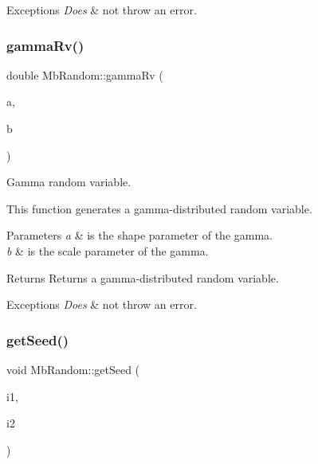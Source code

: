 \begin{DoxyExceptions}{Exceptions}
{\em Does} & not throw an error. \\
\hline
\end{DoxyExceptions}
\mbox{\label{class_mb_random_ac5f030bb3dab8a93bd3430e8b9319d88}} 
\subsubsection{\texorpdfstring{gammaRv()}{gammaRv()}}
{\footnotesize\ttfamily double Mb\+Random\+::gamma\+Rv (\begin{DoxyParamCaption}\item[{double}]{a,  }\item[{double}]{b }\end{DoxyParamCaption})}



Gamma random variable. 

This function generates a gamma-\/distributed random variable.


\begin{DoxyParams}{Parameters}
{\em a} & is the shape parameter of the gamma. \\
\hline
{\em b} & is the scale parameter of the gamma. \\
\hline
\end{DoxyParams}
\begin{DoxyReturn}{Returns}
Returns a gamma-\/distributed random variable. 
\end{DoxyReturn}

\begin{DoxyExceptions}{Exceptions}
{\em Does} & not throw an error. \\
\hline
\end{DoxyExceptions}
\mbox{\label{class_mb_random_a5a143a97da5fa43d5220fc628ceabe25}} 
\subsubsection{\texorpdfstring{getSeed()}{getSeed()}}
{\footnotesize\ttfamily void Mb\+Random\+::get\+Seed (\begin{DoxyParamCaption}\item[{\mbox{\hyperlink{_mb_random_8h_a4aa644a391dc423f6cb86710cc056d8b}{seed\+Type}} \&}]{i1,  }\item[{\mbox{\hyperlink{_mb_random_8h_a4aa644a391dc423f6cb86710cc056d8b}{seed\+Type}} \&}]{i2 }\end{DoxyParamCaption})}



